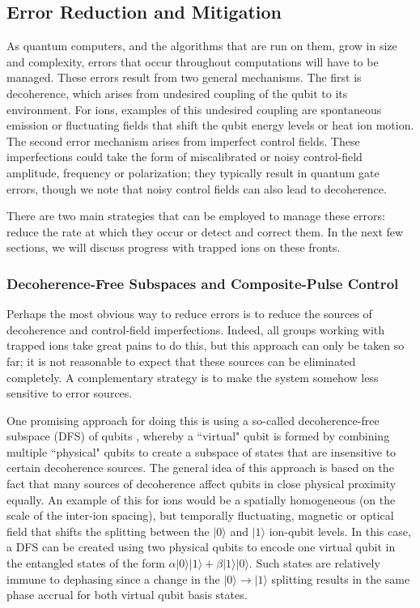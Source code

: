 \documentclass[%
12pt,
 amsmath,amssymb,
]{revtex4-2}
\newcommand{\zero}{|0 \rangle}
\newcommand{\one}{|1 \rangle}
\begin{document}
\subsection{Error Reduction and Mitigation}
\label{ErrorReducandMit}
As quantum computers, and the algorithms that are run on them, grow in size and complexity, errors that occur throughout computations will have to be managed.  These errors result from two general mechanisms.  The first is decoherence, which arises from undesired coupling of the qubit to its environment.  For ions, examples of this undesired coupling are spontaneous emission or fluctuating fields that shift the qubit energy levels or heat ion motion.  The second error mechanism arises from imperfect control fields.  These imperfections could take the form of miscalibrated or noisy control-field amplitude, frequency or polarization; they typically result in quantum gate errors, though we note that noisy control fields can also lead to decoherence.

There are two main strategies that can be employed to manage these errors: reduce the rate at which they occur or detect and correct them.  In the next few sections, we will discuss progress with trapped ions on these fronts.

\subsubsection{Decoherence-Free Subspaces and Composite-Pulse Control}
\label{DFS}
Perhaps the most obvious way to reduce errors is to reduce the sources of decoherence and control-field imperfections.  Indeed, all groups working with trapped ions take great pains to do this, but this approach can only be taken so far; it is not reasonable to expect that these sources can be eliminated completely.  A complementary strategy is to make the system somehow less sensitive to error sources.

One promising approach for doing this is using a so-called decoherence-free subspace (DFS) of qubits \cite{LidarDFS1998, ZanardiDFS1997, DuanDFS1998}, whereby a ``virtual" qubit \cite{JonesQCArchitecture2012} is formed by combining multiple ``physical" qubits to create a subspace of states that are insensitive to certain decoherence sources.  The general idea of this approach is based on the fact that many sources of decoherence affect qubits in close physical proximity equally.  An example of this for ions would be a spatially homogeneous (on the scale of the inter-ion spacing), but temporally fluctuating, magnetic or optical field that shifts the splitting between the $\zero$ and $\one$ ion-qubit levels.  In this case, a DFS can be created using two physical qubits to encode one virtual qubit in the entangled states of the form $\alpha\zero\one+\beta\one\zero$.  Such states are relatively immune to dephasing since a change in the $\zero\rightarrow\one$ splitting results in the same phase accrual for both virtual qubit basis states.
\end{document}
